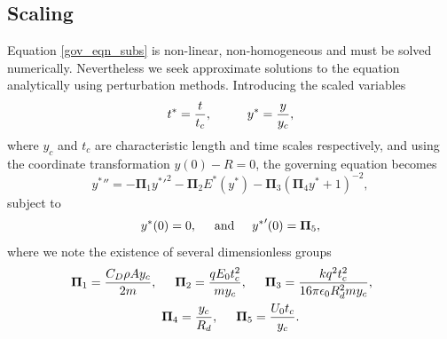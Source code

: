 \documentclass[aip,reprint, floatfix]{revtex4-1}
\begin{document}
\subsection{Scaling}
Equation \ref{gov_eqn_subs} is non-linear, non-homogeneous and must be solved numerically. Nevertheless we seek approximate solutions to the equation analytically using perturbation methods. Introducing the scaled variables
\begin{equation}
 t^* = \frac{t}{t_c}, \hspace{10 mm} y^* = \frac{y}{y_c}, \end{equation}
where $y_c$ and $t_c$ are characteristic length and time scales respectively, and using the coordinate transformation $y(0) - R = 0$, the governing equation becomes
\begin{equation}
\label{pi_terms}
 {y^*}'' = - \mathbf{\Pi}_1 {y^*}'^2
- \mathbf{\Pi}_2 E^* ( {y^*} ) 
- \mathbf{\Pi}_3 \left( \mathbf{\Pi}_4 {y^*} + 1 \right)^{-2},
\end{equation}
subject to
\begin{equation*}
{y^*}(0) = 0, \hspace{5 mm} \mbox{and} \hspace{5 mm} {y^*}'(0) = \mathbf{\Pi}_5,
\end{equation*}
where we note the existence of several dimensionless groups
\begin{gather*}
\mathbf{\Pi}_1 = \frac{C_D \rho A y_c}{2 m}, \hspace{5 mm}
\mathbf{\Pi}_2 = \frac{q E_0 t_c^2}{m y_c}, \hspace{5 mm}
\mathbf{\Pi}_3 = \frac{k q^2 t_c^2}{16 \pi \epsilon_0 R_d^2 m y_c}, \hspace{5 mm}\\
\mathbf{\Pi}_4 = \frac{y_c}{R_d}, \hspace{5 mm}
\mathbf{\Pi}_5 = \frac{U_0 t_c}{y_c}.
\end{gather*}
\end{document}
